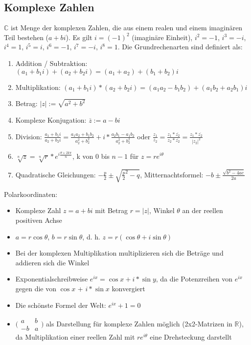 \documentclass[12pt,landscape]{article}
\begin{document}
\begin{multicols}{3}
\subsection{Komplexe Zahlen}
$\mathbb{C}$ ist Menge der komplexen Zahlen, die aus einem realen und einem imaginären Teil bestehen ($a + bi$). Es gilt $i = (-1)^2$ (imaginäre Einheit), $i^2 = -1$, $i^3 = -i$, $i^4 = 1$, $i^5 = i$, $i^6 = -1$, $i^7 = -i$, $i^8 = 1$. Die Grundrechenarten sind definiert als:
\begin{enumerate}
\item Addition / Subtraktion: $(a_1 + b_1i) + (a_2 + b_2i) = (a_1 + a_2) + (b_1 + b_2)i$
\item Multiplikation: $(a_1 + b_1i) * (a_2 + b_2i) = (a_1a_2 - b_1b_2) + (a_1b_2 + a_2b_1)i$
\item Betrag: $|z| := \sqrt{a^2 + b^2}$
\item Komplexe Konjugation: $\overline{z} := a - bi$
\item Division: $\frac{a_1 + b_1i}{a_2 + b_2i} = \frac{a_1a_2 + b_1b_2}{a_2^2 + b_2^2} + i * \frac{a_2b_1 - a_1b_2}{a_2^2 + b_2^2}$ oder $\frac{z_1}{z_2} = \frac{z_1*\overline{z_2}}{z_2*\overline{z_2}} = \frac{z_1 * \overline{z_2}}{|z_2|^2}$
\item $\sqrt[n]{z} = \sqrt[n]{r} * e^{i\frac{\theta+2k\pi}{n}}$, k von 0 bis $n - 1$ für $z = re^{i\theta}$
\item Quadratische Gleichungen: $-\frac{p}{2} \pm \sqrt{\frac{p}{2}^2 - q}$, Mitternachtsformel: $-b \pm \frac{\sqrt{b^2 -4ac}}{2a}$
\end{enumerate}
Polarkoordinaten:
\begin{itemize}
\item Komplexe Zahl $z = a + bi$ mit Betrag $r = |z|$, Winkel $\theta$ an der reellen positiven Achse
\item $a = r\cos \theta$, $b = r\sin \theta$, d. h. $z = r(\cos \theta + i\sin \theta)$
\item Bei der komplexen Multiplikation multiplizieren sich die Beträge und addieren sich die Winkel
\item Exponentialschreibweise $e^{ix} = \cos x + i * \sin y$, da die Potenzreihen von $e^{ix}$ gegen die von $\cos x$ + $i * \sin x$ konvergiert
\item Die schönste Formel der Welt: $e^{ix} + 1 = 0$
\item $\bigl(\begin{smallmatrix}a & b \\ -b & a\end{smallmatrix} \bigr)$ als Darstellung für komplexe Zahlen möglich (2x2-Matrizen in $\mathbb{R}$), da Multiplikation einer reellen Zahl mit $re^{i\theta}$ eine Drehsteckung darstellt
\end{itemize}

\end{multicols}
\end{document}
